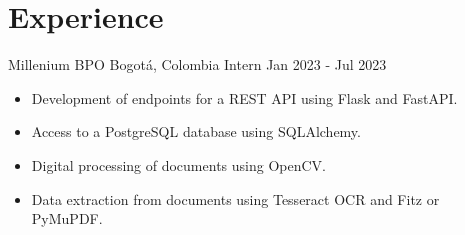 \section*{Experience}
\begin{entrylist}
    \entry
    {Millenium BPO}
    {Bogotá, Colombia}
    {Intern}
    {Jan 2023 - Jul 2023}
    {
        \begin{itemize}[noitemsep,topsep=-3pt, partopsep=-40pt, leftmargin=1em]
            \item Development of endpoints for a REST API using Flask and FastAPI.
            \item Access to a PostgreSQL database using SQLAlchemy.
            \item Digital processing of documents using OpenCV.
            \item Data extraction from documents using Tesseract OCR and Fitz or PyMuPDF.
        \end{itemize}
    }
\end{entrylist}